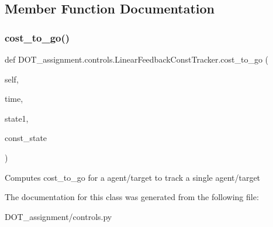 \subsection{Member Function Documentation}
\mbox{\label{class_d_o_t__assignment_1_1controls_1_1_linear_feedback_const_tracker_ab3b7206cce744da499d83896c1c2dc27}} 
\subsubsection{\texorpdfstring{cost\_to\_go()}{cost\_to\_go()}}
{\footnotesize\ttfamily def D\+O\+T\+\_\+assignment.\+controls.\+Linear\+Feedback\+Const\+Tracker.\+cost\+\_\+to\+\_\+go (\begin{DoxyParamCaption}\item[{}]{self,  }\item[{}]{time,  }\item[{}]{state1,  }\item[{}]{const\+\_\+state }\end{DoxyParamCaption})}

\begin{DoxyVerb}Computes cost_to_go for a agent/target to track a single agent/target
\end{DoxyVerb}
 

The documentation for this class was generated from the following file\+:\begin{DoxyCompactItemize}
\item 
D\+O\+T\+\_\+assignment/controls.\+py\end{DoxyCompactItemize}
